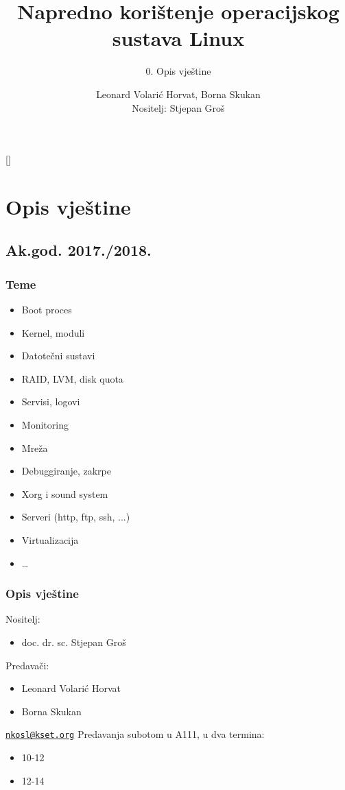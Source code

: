\documentclass[t]{beamer}
\date{}
\title[NKOSL]{Napredno korištenje operacijskog sustava Linux}
\author[]{Leonard Volarić Horvat, Borna Skukan\\{\small Nositelj: Stjepan Groš}}
\subtitle{0. Opis vještine}
\institute[]{Sveučilište u Zagrebu\\Fakultet elektrotehnike i računarstva}
\begin{document}
{
	\begin{frame}
		\maketitle
	\end{frame}
}

\section{Opis vještine}
\subsection{Ak.god. 2017./2018.}

\begin{frame}
	\frametitle{Teme}
	\begin{itemize}
		\item Boot proces
		\item Kernel, moduli
		\item Datotečni sustavi
		\item RAID, LVM, disk quota
		\item Servisi, logovi
		\item Monitoring
		\item Mreža
		\item Debuggiranje, zakrpe
		\item Xorg i sound system
		\item Serveri (http, ftp, ssh, ...)
		\item Virtualizacija
		\item \dots
	\end{itemize}
\end{frame}

\begin{frame}
	\frametitle{Opis vještine}
	Nositelj:
	\begin{itemize}
		\item[] doc. dr. sc. Stjepan Groš
	\end{itemize}
	Predavači:
	\begin{itemize}
		\item Leonard Volarić Horvat
		\item Borna Skukan
	\end{itemize}
	\vfill
	\href{mailto:nkosl@kset.org}{\nolinkurl{nkosl@kset.org}}
	\vfill
	Predavanja subotom u A111, u dva termina:
	\begin{itemize}
		\item 10-12
		\item 12-14
	\end{itemize}
\end{frame}
\end{document}
